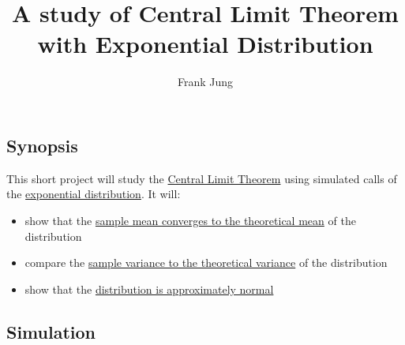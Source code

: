 \documentclass[legalpaper,11pt]{article}
\title{A study of Central Limit Theorem with Exponential Distribution}
\author{Frank Jung}
\date{}
\begin{document}
\maketitle


\subsection{Synopsis}\label{synopsis}

This short project will study the
\href{https://en.wikipedia.org/wiki/Central_limit_theorem}{Central Limit
Theorem} using simulated calls of the
\href{https://en.wikipedia.org/wiki/Exponential_distribution}{exponential
distribution}. It will:

\begin{itemize}
\itemsep1pt\parskip0pt
\item
  show that the \hyperref[sample-mean-versus-theoretical-mean]{sample
  mean converges to the theoretical mean} of the distribution
\item
  compare the \hyperref[sample-mean-versus-theoretical-mean]{sample
  variance to the theoretical variance} of the distribution
\item
  show that the
  \hyperref[distribution-is-approximately-normal]{distribution is
  approximately normal}
\end{itemize}

\subsection{Simulation}\label{simulation}
\end{document}
